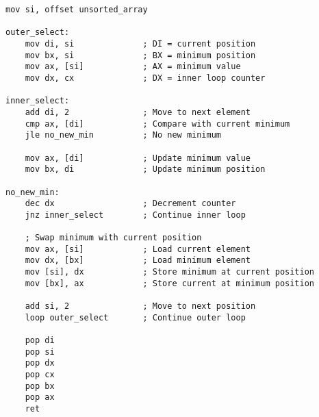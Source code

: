 \documentclass[../main.tex]{subfiles}
\begin{document}
\begin{lstlisting}[language={[x86masm]Assembler}, caption=Pengurutan Array, label={lst:array-sort}]
    mov si, offset unsorted_array
    
outer_select:
    mov di, si              ; DI = current position
    mov bx, si              ; BX = minimum position
    mov ax, [si]            ; AX = minimum value
    mov dx, cx              ; DX = inner loop counter
    
inner_select:
    add di, 2               ; Move to next element
    cmp ax, [di]            ; Compare with current minimum
    jle no_new_min          ; No new minimum
    
    mov ax, [di]            ; Update minimum value
    mov bx, di              ; Update minimum position
    
no_new_min:
    dec dx                  ; Decrement counter
    jnz inner_select        ; Continue inner loop
    
    ; Swap minimum with current position
    mov ax, [si]            ; Load current element
    mov dx, [bx]            ; Load minimum element
    mov [si], dx            ; Store minimum at current position
    mov [bx], ax            ; Store current at minimum position
    
    add si, 2               ; Move to next position
    loop outer_select       ; Continue outer loop
    
    pop di
    pop si
    pop dx
    pop cx
    pop bx
    pop ax
    ret
                \end{lstlisting}
\end{document}

